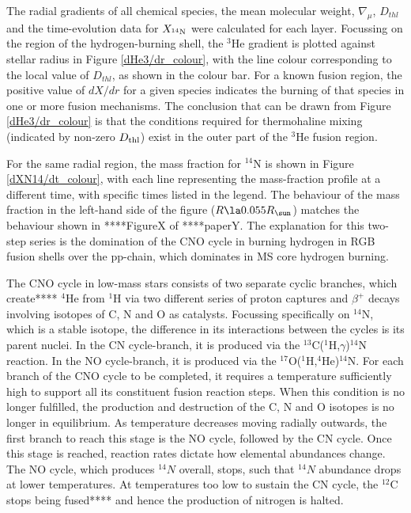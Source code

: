 \documentclass[usenatbib]{mnras}
\begin{document}
The radial gradients of all chemical species, the mean molecular weight, $\nabla_{\mu}$,  $D_{thl}$ and the time-evolution data for $X_{^{14}\textnormal{N}}$ were calculated for each layer. Focussing on the region of the hydrogen-burning shell, the $^{3}$He gradient is plotted against stellar radius in Figure \ref{dHe3/dr_colour}, with the line colour corresponding to the local value of $D_{thl}$, as shown in the colour bar. For a known fusion region, the positive value of $dX/dr$ for a given species indicates the burning of that species in one or more fusion mechanisms. The conclusion that can be drawn from Figure \ref{dHe3/dr_colour} is that the conditions required for thermohaline mixing (indicated by non-zero $D_{\textnormal{thl}}$) exist in the outer part of the $^{3}$He fusion region.

For the same radial region, the mass fraction for $^{14}$N is shown in Figure \ref{dXN14/dt_colour}, with each line representing the mass-fraction profile at a different time, with specific times listed in the legend. The behaviour of the mass fraction in the left-hand side of the figure ($R \la 0.055R_{\sun}$) matches the behaviour shown in ****FigureX of ****paperY. The explanation for this two-step series is the domination of the CNO cycle in burning hydrogen in RGB fusion shells over the pp-chain, which dominates in MS core hydrogen burning. 

The CNO cycle in low-mass stars consists of two separate cyclic branches, which create**** $^{4}$He from $^{1}$H via two different series of proton captures and $\beta ^{+}$ decays involving isotopes of C, N and O as catalysts. Focussing specifically on $^{14}$N, which is a stable isotope, the difference in its interactions between the cycles is its parent nuclei. In the CN cycle-branch, it is produced via the $^{13}$C($^{1}$H,$\gamma$)$^{14}$N reaction. In the NO cycle-branch, it is produced via the $^{17}$O($^{1}$H,$^{4}$He)$^{14}$N. For each branch of the CNO cycle to be completed, it requires a temperature sufficiently high to support all its constituent fusion reaction steps. When this condition is no longer fulfilled, the production and destruction of the C, N and O isotopes is no longer in equilibrium. As temperature decreases moving radially outwards, the first branch to reach this stage is the NO cycle, followed by the CN cycle. Once this stage is reached, reaction rates dictate how elemental abundances change. The NO cycle, which produces $^{14}N$ overall, stops, such that $^{14}N$ abundance drops at lower temperatures. At temperatures too low to sustain the CN cycle, the $^{12}$C stops being fused**** and hence the production of nitrogen is halted.
\end{document}
